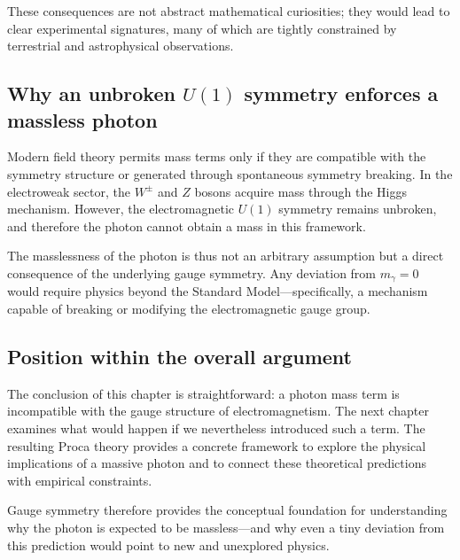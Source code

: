 These consequences are not abstract mathematical curiosities; they would 
lead to clear experimental signatures, many of which are tightly constrained 
by terrestrial and astrophysical observations.

\subsection*{Why an unbroken $U(1)$ symmetry enforces a massless photon}
Modern field theory permits mass terms only if they are compatible with the 
symmetry structure or generated through spontaneous symmetry breaking. 
In the electroweak sector, the $W^\pm$ and $Z$ bosons acquire mass through 
the Higgs mechanism. However, the electromagnetic $U(1)$ symmetry remains 
unbroken, and therefore the photon cannot obtain a mass in this framework.

The masslessness of the photon is thus not an arbitrary assumption but a 
direct consequence of the underlying gauge symmetry. Any deviation from 
$m_\gamma = 0$ would require physics beyond the Standard Model—specifically, 
a mechanism capable of breaking or modifying the electromagnetic gauge group.

\subsection*{Position within the overall argument}
The conclusion of this chapter is straightforward: a photon mass term is 
incompatible with the gauge structure of electromagnetism. The next chapter 
examines what would happen if we nevertheless introduced such a term. The 
resulting Proca theory provides a concrete framework to explore the physical 
implications of a massive photon and to connect these theoretical predictions 
with empirical constraints.

Gauge symmetry therefore provides the conceptual foundation for understanding 
why the photon is expected to be massless—and why even a tiny deviation from 
this prediction would point to new and unexplored physics.

